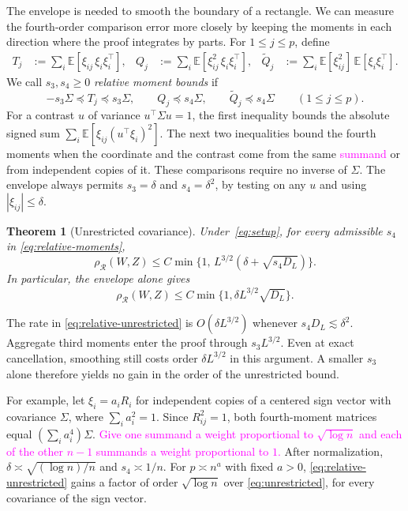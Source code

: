 \documentclass[11pt,letterpaper]{article}
\newtheorem{theorem}{Theorem}
\theoremstyle{remark}
\newcommand{\E}{\mathbb E}
\newcommand{\rh}{\rho_{\mathcal R}}
\begin{document}
The envelope is needed to smooth the boundary of a rectangle. We can measure the fourth-order comparison error more closely by keeping the moments in each direction where the proof integrates by parts. For $1\le j\le p$, define
\begin{align*}
 T_j&:=\sum_i\E[\xi_{ij}\,\xi_i\xi_i^\top],&
 Q_j&:=\sum_i\E[\xi_{ij}^2\,\xi_i\xi_i^\top],&
 \widetilde Q_j&:=\sum_i\E[\xi_{ij}^2]\,\E[\xi_i\xi_i^\top].
\end{align*}
We call $s_3,s_4\ge0$ \emph{relative moment bounds} if
\begin{equation}\label{eq:relative-moments}
 -s_3\Sigma\preceq T_j\preceq s_3\Sigma,\qquad
 Q_j\preceq s_4\Sigma,\qquad \widetilde Q_j\preceq s_4\Sigma
 \qquad (1\le j\le p).
\end{equation}
For a contrast $u$ of variance $u^\top\Sigma u=1$, the first inequality bounds the absolute signed sum $\sum_i\E[\xi_{ij}(u^\top\xi_i)^2]$. The next two inequalities bound the fourth moments when the coordinate and the contrast come from the same \textcolor{magenta}{summand} or from independent copies of it. These comparisons require no inverse of $\Sigma$. The envelope always permits $s_3=\delta$ and $s_4=\delta^2$, by testing on any $u$ and using $|\xi_{ij}|\le\delta$.

\begin{theorem}[Unrestricted covariance]\label{thm:unrestricted}
Under~\eqref{eq:setup}, for every admissible $s_4$ in \eqref{eq:relative-moments},
\begin{equation}\label{eq:relative-unrestricted}
 \rh(W,Z)\le C\min\{1,\,L^{3/2}(\delta+\sqrt{s_4D_L})\}.
\end{equation}
In particular, the envelope alone gives
\begin{equation}
 \rh(W,Z)\le C\min\{1,\delta L^{3/2}\sqrt{D_L}\}.
 \label{eq:unrestricted}
\end{equation}
\end{theorem}
The rate in \eqref{eq:relative-unrestricted} is $O(\delta L^{3/2})$ whenever $s_4D_L\lesssim\delta^2$. Aggregate third moments enter the proof through $s_3L^{3/2}$. Even at exact cancellation, smoothing still costs order $\delta L^{3/2}$ in this argument. A smaller $s_3$ alone therefore yields no gain in the order of the unrestricted bound.

For example, let $\xi_i=a_i R_i$ for independent copies of a centered sign vector with covariance $\Sigma$, where $\sum_i a_i^2=1$. Since $R_{ij}^2=1$, both fourth-moment matrices equal $(\sum_i a_i^4)\Sigma$. \textcolor{magenta}{Give one summand a weight proportional to $\sqrt{\log n}$ and each of the other $n-1$ summands a weight proportional to $1$.} After normalization, $\delta\asymp\sqrt{(\log n)/n}$ and $s_4\asymp1/n$. For $p\asymp n^a$ with fixed $a>0$, \eqref{eq:relative-unrestricted} gains a factor of order $\sqrt{\log n}$ over \eqref{eq:unrestricted}, for every covariance of the sign vector.
\end{document}
